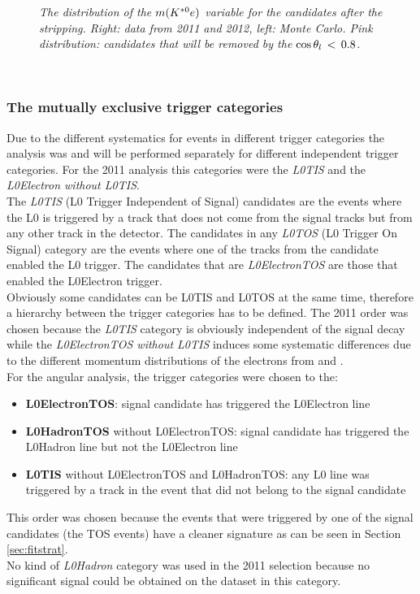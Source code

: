 \begin{figure}[!h]
\begin{center}
\end{center}
\vspace*{-0.8cm}
\caption{\textit{The distribution of the $m(K^{*0} e)$ variable for the \BdKstee candidates after the stripping. Right: \lhcb data from 2011 and 2012, left: \BdKstee Monte Carlo. Pink distribution: candidates that will be removed by the $\cos{\theta_l} \, < \, 0.8$.}}
\label{fig:kstaremass}
\end{figure}
\\
\subsubsection{The mutually exclusive trigger categories}
\label{sec:triggercat}
Due to the different systematics for events in different trigger categories the \BdKstee analysis was and will be performed separately for different independent trigger categories. For the 2011 analysis this categories were the \textit{L0TIS} and the \textit{L0Electron without L0TIS}.\\
The \textit{L0TIS} (L0 Trigger Independent of Signal) candidates are the events where the L0 is triggered by a track that does not come from the signal tracks but from any other track in the detector. The candidates in any \textit{L0TOS} (L0 Trigger On Signal) category are the events where one of the tracks from the \BdKstee candidate enabled the L0 trigger. The candidates that are \textit{L0ElectronTOS} are those that enabled the L0Electron trigger.\\
Obviously some candidates can be L0TIS and L0TOS at the same time, therefore a hierarchy between the trigger categories has to be defined.
The 2011 order was chosen because the \textit{L0TIS} category is obviously independent of the signal decay while the \textit{L0ElectronTOS without L0TIS} induces some systematic differences due to the different momentum distributions of the electrons from \BdKstee and \BdToJPsieeKst. \\
For the angular analysis, the trigger categories were chosen to the:
\begin{itemize}
\item \textbf{L0ElectronTOS}: signal candidate has triggered the L0Electron line
\item \textbf{L0HadronTOS} without L0ElectronTOS: signal candidate has triggered the L0Hadron line but not the L0Electron line
\item \textbf{L0TIS} without L0ElectronTOS and L0HadronTOS: any L0 line was triggered by a track in the event that did not belong to the signal candidate
\end{itemize}
This order was chosen because the events that were triggered by one of the signal candidates (the TOS events) have a cleaner signature as can be seen in Section \ref{sec:fitstrat}.\\
No kind of \textit{L0Hadron} category was used in the 2011 selection because no significant signal could be obtained on the dataset in this category.\\


